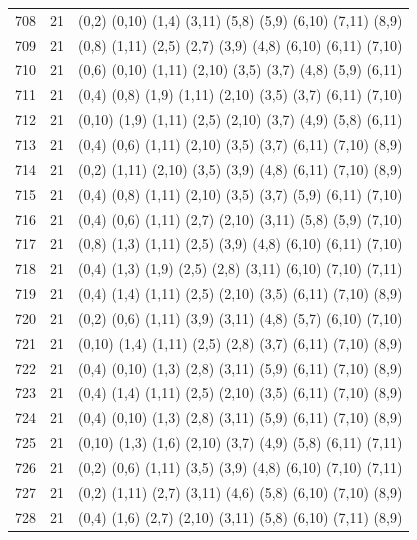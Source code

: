 \begin{appendix}
{\begin{longtable}{lll}
    708& 21 & (0,2)   (0,10)  (1,4)   (3,11)  (5,8)   (5,9)   (6,10)  (7,11)  (8,9)\\
    709& 21 & (0,8)   (1,11)  (2,5)   (2,7)   (3,9)   (4,8)   (6,10)  (6,11)  (7,10)\\
    710& 21 & (0,6)   (0,10)  (1,11)  (2,10)  (3,5)   (3,7)   (4,8)   (5,9)   (6,11)\\
    711& 21 & (0,4)   (0,8)   (1,9)   (1,11)  (2,10)  (3,5)   (3,7)   (6,11)  (7,10)\\
    712& 21 & (0,10)  (1,9)   (1,11)  (2,5)   (2,10)  (3,7)   (4,9)   (5,8)   (6,11)\\
    713& 21 & (0,4)   (0,6)   (1,11)  (2,10)  (3,5)   (3,7)   (6,11)  (7,10)  (8,9)\\
    714& 21 & (0,2)   (1,11)  (2,10)  (3,5)   (3,9)   (4,8)   (6,11)  (7,10)  (8,9)\\
    715& 21 & (0,4)   (0,8)   (1,11)  (2,10)  (3,5)   (3,7)   (5,9)   (6,11)  (7,10)\\
    716& 21 & (0,4)   (0,6)   (1,11)  (2,7)   (2,10)  (3,11)  (5,8)   (5,9)   (7,10)\\
    717& 21 & (0,8)   (1,3)   (1,11)  (2,5)   (3,9)   (4,8)   (6,10)  (6,11)  (7,10)\\
    718& 21 & (0,4)   (1,3)   (1,9)   (2,5)   (2,8)   (3,11)  (6,10)  (7,10)  (7,11)\\
    719& 21 & (0,4)   (1,4)   (1,11)  (2,5)   (2,10)  (3,5)   (6,11)  (7,10)  (8,9)\\
    720& 21 & (0,2)   (0,6)   (1,11)  (3,9)   (3,11)  (4,8)   (5,7)   (6,10)  (7,10)\\
    721& 21 & (0,10)  (1,4)   (1,11)  (2,5)   (2,8)   (3,7)   (6,11)  (7,10)  (8,9)\\
    722& 21 & (0,4)   (0,10)  (1,3)   (2,8)   (3,11)  (5,9)   (6,11)  (7,10)  (8,9)\\
    723& 21 & (0,4)   (1,4)   (1,11)  (2,5)   (2,10)  (3,5)   (6,11)  (7,10)  (8,9)\\
    724& 21 & (0,4)   (0,10)  (1,3)   (2,8)   (3,11)  (5,9)   (6,11)  (7,10)  (8,9)\\
    725& 21 & (0,10)  (1,3)   (1,6)   (2,10)  (3,7)   (4,9)   (5,8)   (6,11)  (7,11)\\
    726& 21 & (0,2)   (0,6)   (1,11)  (3,5)   (3,9)   (4,8)   (6,10)  (7,10)  (7,11)\\
    727& 21 & (0,2)   (1,11)  (2,7)   (3,11)  (4,6)   (5,8)   (6,10)  (7,10)  (8,9)\\
    728& 21 & (0,4)   (1,6)   (2,7)   (2,10)  (3,11)  (5,8)   (6,10)  (7,11)  (8,9)\\

\end{longtable}}
\end{appendix}
